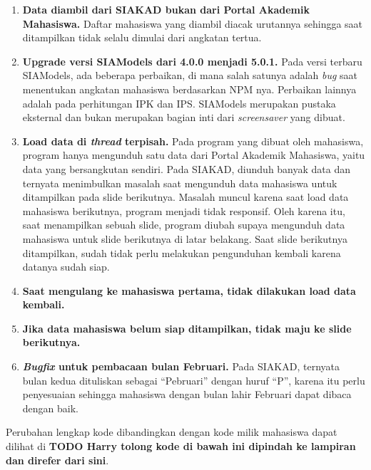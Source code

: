 \begin{enumerate}
	\item \textbf{Data diambil dari SIAKAD bukan dari Portal Akademik Mahasiswa.} Daftar mahasiswa yang diambil diacak urutannya sehingga saat ditampilkan tidak selalu dimulai dari angkatan tertua.
    \item \textbf{Upgrade versi SIAModels dari 4.0.0 menjadi 5.0.1.} Pada versi terbaru SIAModels, ada beberapa perbaikan, di mana salah satunya adalah \textit{bug} saat menentukan angkatan mahasiswa berdasarkan NPM nya. Perbaikan lainnya adalah pada perhitungan IPK dan IPS. SIAModels merupakan pustaka eksternal dan bukan merupakan bagian inti dari \textit{screensaver} yang dibuat.
    \item \textbf{Load data di \textit{thread} terpisah.} Pada program yang dibuat oleh mahasiswa, program hanya mengunduh satu data dari Portal Akademik Mahasiswa, yaitu data yang bersangkutan sendiri. Pada SIAKAD, diunduh banyak data dan ternyata menimbulkan masalah saat mengunduh data mahasiswa untuk ditampilkan pada slide berikutnya. Masalah muncul karena saat load data mahasiswa berikutnya, program menjadi tidak responsif. Oleh karena itu, saat menampilkan sebuah slide, program diubah supaya mengunduh data mahasiswa untuk slide berikutnya di latar belakang. Saat slide berikutnya ditampilkan, sudah tidak perlu melakukan pengunduhan kembali karena datanya sudah siap.
    \item \textbf{Saat mengulang ke mahasiswa pertama, tidak dilakukan load data kembali.}
    \item \textbf{Jika data mahasiswa belum siap ditampilkan, tidak maju ke slide berikutnya.}
    \item \textbf{\textit{Bugfix} untuk pembacaan bulan Februari.} Pada SIAKAD, ternyata bulan kedua dituliskan sebagai ``Pebruari'' dengan huruf ``P'', karena itu perlu penyesuaian sehingga mahasiswa dengan bulan lahir Februari dapat dibaca dengan baik.
\end{enumerate}

Perubahan lengkap kode dibandingkan dengan kode milik mahasiswa dapat dilihat di \textbf{TODO Harry tolong kode di bawah ini dipindah ke lampiran dan direfer dari sini}.


